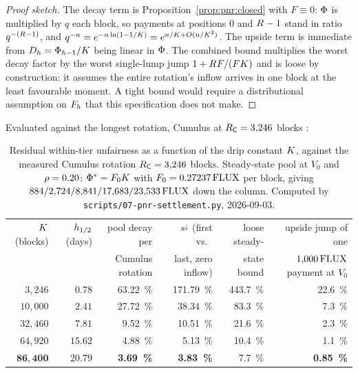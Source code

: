\begin{proof}[Proof sketch]
The decay term is Proposition~\ref{prop:pnr:closed} with $F \equiv 0$: $\Phi$ is multiplied by $q$
each block, so payments at positions $0$ and $R_{}-1$ stand in ratio $q^{-(R_{}-1)}$, and
$q^{-n} = e^{-n\ln(1-1/K)} = e^{n/K + O(n/K^{2})}$. The upside term is immediate from
$D_{h} = \Phi_{h-1}/K$ being linear in $\Phi$. The combined bound multiplies the worst
decay factor by the worst single-lump jump $1 + R_{} F/(FK)$ and is loose by construction: it
assumes the entire rotation's inflow arrives in one block at the least favourable moment. A tight
bound would require a distributional assumption on $F_{h}$ that this specification does not make.
\end{proof}

Evaluated against the longest rotation, Cumulus at $R_{\mathsf{C}} = 3{,}246$ blocks
:

\begin{table}[H]
\centering
\small
\begin{tabular}{rrrrrr}
\toprule
$K$ (blocks) & $h_{1/2}$ (days) & pool decay per & $s^{\downarrow}$ (first vs.\ & loose steady- & upside jump of one\\
 & & Cumulus rotation & last, zero inflow) & state bound & $1{,}000\,\mathrm{FLUX}$ payment at $V_0$\\
\midrule
$3{,}246$   & $0.78$  & \SI{63.22}{\percent} & \SI{171.79}{\percent} & \SI{443.7}{\percent} & \SI{22.6}{\percent}\\
$10{,}000$  & $2.41$  & \SI{27.72}{\percent} & \SI{38.34}{\percent}  & \SI{83.3}{\percent}  & \SI{7.3}{\percent}\\
$32{,}460$  & $7.81$  & \SI{9.52}{\percent}  & \SI{10.51}{\percent}  & \SI{21.6}{\percent}  & \SI{2.3}{\percent}\\
$64{,}920$  & $15.62$ & \SI{4.88}{\percent}  & \SI{5.13}{\percent}   & \SI{10.4}{\percent}  & \SI{1.1}{\percent}\\
$\mathbf{86{,}400}$ & $\mathbf{20.79}$ & \textbf{\SI{3.69}{\percent}} & \textbf{\SI{3.83}{\percent}} & \SI{7.7}{\percent} & \textbf{\SI{0.85}{\percent}}\\
\bottomrule
\end{tabular}
\caption{Residual within-tier unfairness as a function of the drip constant $K$, against the
measured Cumulus rotation $R_{\mathsf{C}} = 3{,}246$ blocks. Steady-state pool at $V_0$ and
$\rho = 0.20$: $\Phi^{*} = F_0K$ with $F_0 = 0.27237\,\mathrm{FLUX}$ per block, giving
$884 / 2{,}724 / 8{,}841 / 17{,}683 / 23{,}533\,\mathrm{FLUX}$ down the column. Computed by
\texttt{scripts/\allowbreak{}07-pnr-settlement.\allowbreak{}py}, 2026-09-03.}
\label{tab:pnr:drip}
\end{table}

